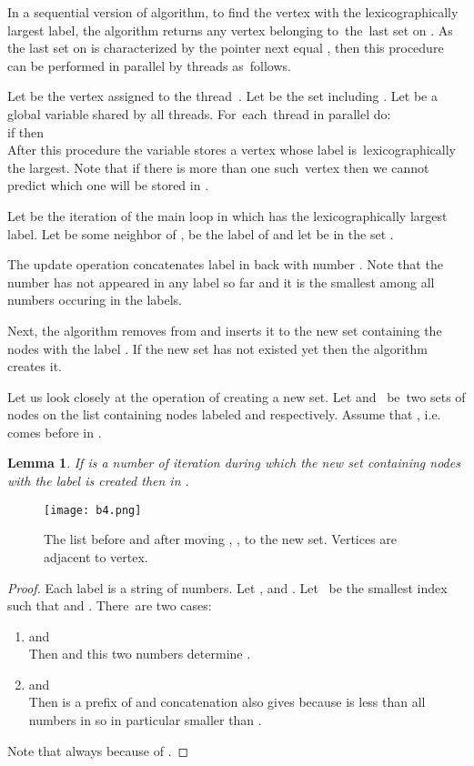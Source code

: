 \documentclass[a4paper, 11pt]{article}
\newtheorem{lm}[tw]{Lemma}
\begin{document}
In a sequential version of algorithm, to find the vertex with the lexicographically largest label, 
the algorithm returns any vertex belonging to~the~last set on . As the last set on  is 
characterized by the pointer next equal , then this procedure can be performed in parallel 
by  threads as~follows. 

Let  be the vertex assigned to the thread~. Let  be the set 
including . Let  be a global variable shared by all threads.
For~each~thread  in parallel do:\\

\hspace{0.75cm} if  then \\

After this procedure the  variable stores a vertex whose label is~lexicographically 
the largest. Note that if there is more than one such~vertex then we cannot predict which one 
will be stored in .

Let  be the iteration of the main loop in which  has the lexicographically largest label.
Let  be some neighbor of ,  be the label of  and let  be in the set .

The update operation concatenates label  in back with number . Note that the number  
has not appeared in any label so far and it is the smallest among all numbers occuring in the labels. 

Next, the algorithm removes  from  and inserts it to the new set containing the nodes with
the label . If the new set has not existed yet then the algorithm creates it.

Let us look closely at the operation of creating a new set. Let  and~ be~two sets of nodes on 
the list  containing nodes labeled  and  respectively. Assume that , i.e. 
 comes before  in .

\begin{lm} If  is a number of iteration during which the new set containing nodes with the label 
     is created then  in .
\end{lm}

\begin{figure}[h]
    \begin{center}
        \texttt{[image: b4.png]}
        \caption{The list  before and after moving , ,  to the new set. 
        Vertices  are adjacent to  vertex.}
    \end{center}
\end{figure}

\begin{proof} Each label is a string of numbers. Let , 
     and 
    .
    Let~ be the smallest index such that  and . There~are two cases:
    \begin{enumerate}
        \item  and \\
            Then  and this two numbers determine . 
        \item  and \\
            Then  is a prefix of  and concatenation also gives  
            because  is less than all numbers in  so in particular smaller than .
    \end{enumerate}
    Note that always  because of .
\end{proof}
\end{document}
